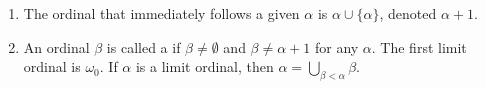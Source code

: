 \begin{enumerate}
\item[(a)] The ordinal that immediately follows a given $\alpha$ is $\alpha \cup \{\alpha\}$, denoted $\alpha + 1$.
\item[(b)] An ordinal $\beta$ is called a  if $\beta \neq \emptyset$ and $\beta \neq \alpha + 1$ for any $\alpha$. The first limit ordinal is $\omega_0$. If $\alpha$ is a limit ordinal, then $\alpha = \bigcup_{\beta < \alpha} \beta$.
\end{enumerate}
